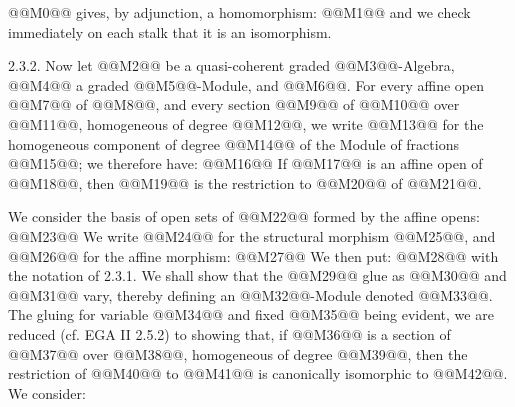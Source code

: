 @@M0@@
gives, by adjunction, a homomorphism:
@@M1@@
and we check immediately on each stalk that it is an isomorphism.

2.3.2. Now let @@M2@@ be a quasi-coherent graded @@M3@@-Algebra, @@M4@@ a graded @@M5@@-Module, and @@M6@@. For every affine open @@M7@@ of @@M8@@, and every section @@M9@@ of @@M10@@ over @@M11@@, homogeneous of degree @@M12@@, we write @@M13@@ for the homogeneous component of degree @@M14@@ of the Module of fractions @@M15@@; we therefore have:
@@M16@@
If @@M17@@ is an affine open of @@M18@@, then @@M19@@ is the restriction to @@M20@@ of @@M21@@.

We consider the basis of open sets of @@M22@@ formed by the affine opens:
@@M23@@
We write @@M24@@ for the structural morphism @@M25@@, and @@M26@@ for the affine morphism:
@@M27@@
We then put:
@@M28@@
with the notation of 2.3.1. We shall show that the @@M29@@ glue as @@M30@@ and @@M31@@ vary, thereby defining an @@M32@@-Module denoted @@M33@@. The gluing for variable @@M34@@ and fixed @@M35@@ being evident, we are reduced (cf. EGA II 2.5.2) to showing that, if @@M36@@ is a section of @@M37@@ over @@M38@@, homogeneous of degree @@M39@@, then the restriction of @@M40@@ to @@M41@@ is canonically isomorphic to @@M42@@. We consider:
